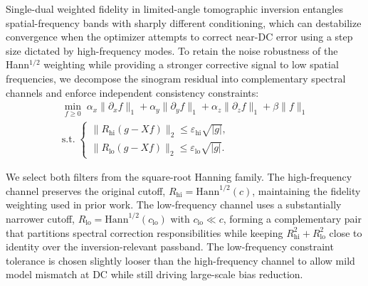 \documentclass[journal, a4paper]{IEEEtran}
\begin{document}
Single-dual weighted fidelity in limited-angle tomographic inversion entangles spatial-frequency bands with sharply different conditioning, which can destabilize convergence when the optimizer attempts to correct near-DC error using a step size dictated by high-frequency modes. To retain the noise robustness of the Hann$^{1/2}$ weighting while providing a stronger corrective signal to low spatial frequencies, we decompose the sinogram residual into complementary spectral channels and enforce independent consistency constraints:
\begin{equation}
\label{eq:twoconstraint}
\begin{split}
    \min_{f \ge 0}\;
\alpha_x \|\partial_x f\|_1 + \alpha_y \|\partial_y f\|_1 + \alpha_z \|\partial_z f\|_1 + \beta \|f\|_1\\
\text{s.t.}\;
\begin{cases}
\|R_{\mathrm{hi}}(g - Xf)\|_2 \le \varepsilon_{\mathrm{hi}}\sqrt{|g|},\\
\|R_{\mathrm{lo}}(g - Xf)\|_2 \le \varepsilon_{\mathrm{lo}}\sqrt{|g|}.
\end{cases}
\end{split}
\end{equation}

We select both filters from the square-root Hanning family. The high-frequency channel preserves the original cutoff, $R_{\mathrm{hi}} = \text{Hann}^{1/2}(c)$, maintaining the fidelity weighting used in prior work. The low-frequency channel uses a substantially narrower cutoff, $R_{\mathrm{lo}} = \text{Hann}^{1/2}(c_{\mathrm{lo}})$ with $c_{\mathrm{lo}} \ll c$, forming a complementary pair that partitions spectral correction responsibilities while keeping $R_{\mathrm{hi}}^2 + R_{\mathrm{lo}}^2$ close to identity over the inversion-relevant passband. The low-frequency constraint tolerance is chosen slightly looser than the high-frequency channel to allow mild model mismatch at DC while still driving large-scale bias reduction.
\end{document}
